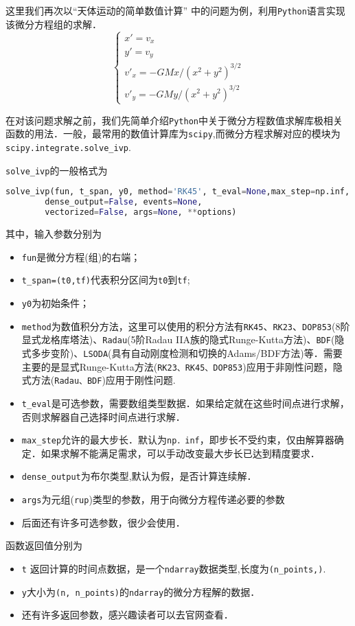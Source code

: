 这里我们再次以“天体运动的简单数值计算” 中的问题为例，利用\verb |Python|语言实现该微分方程组的求解．
\begin{equation}\label{PyIVP_eq}
\begin{cases}
x' = v_x\\
y' = v_y\\
v'_x = -GMx/(x^2 + y^2)^{3/2}\\
v'_y = -GMy/(x^2 + y^2)^{3/2}
\end{cases}
\end{equation}

在对该问题求解之前，我们先简单介绍\verb|Python|中关于微分方程数值求解库极相关函数的用法．一般，最常用的数值计算库为\verb|scipy|,而微分方程求解对应的模块为\verb|scipy.integrate.solve_ivp|.

 \verb|solve_ivp|的一般格式为
 \begin{lstlisting}[language=python]
 solve_ivp(fun, t_span, y0, method='RK45', t_eval=None,max_step=np.inf,
        dense_output=False, events=None, 
        vectorized=False, args=None, **options)
 \end{lstlisting}
 其中，输入参数分别为
\begin{itemize}
\item \verb|fun|是微分方程(组)的右端；
\item  \verb|t_span=(t0,tf)|代表积分区间为\verb|t0|到\verb|tf|;
\item  \verb|y0|为初始条件；
\item \verb|method|为数值积分方法，这里可以使用的积分方法有\verb|RK45|、\verb|RK23|、\verb|DOP853|(8阶显式龙格库塔法)、\verb|Radau|(5阶Radau IIA族的隐式Runge-Kutta方法)、\verb|BDF|(隐式多步变阶)、\verb|LSODA|(具有自动刚度检测和切换的Adams/BDF方法)等．需要主要的是显式Runge-Kutta方法(\verb|RK23、RK45、DOP853|)应用于非刚性问题，隐式方法(\verb|Radau、BDF|)应用于刚性问题.
\item \verb|t_eval|是可选参数，需要数组类型数据．如果给定就在这些时间点进行求解，否则求解器自己选择时间点进行求解．
\item \verb|max_step|允许的最大步长．默认为\verb|np．inf|，即步长不受约束，仅由解算器确定．如果求解不能满足需求，可以手动改变最大步长已达到精度要求．
\item \verb|dense_output|为布尔类型,默认为假，是否计算连续解．
\item \verb|args|为元组(\verb|rup|)类型的参数，用于向微分方程传递必要的参数
\item 后面还有许多可选参数，很少会使用．
\end{itemize}
函数返回值分别为
\begin{itemize}
\item  \verb|t| 返回计算的时间点数据，是一个\verb|ndarray|数据类型,长度为\verb|(n_points,)|.
\item \verb|y|大小为\verb|(n, n_points)|的\verb |ndarray|的微分方程解的数据．
\item 还有许多返回参数，感兴趣读者可以去官网查看．
\end{itemize}


